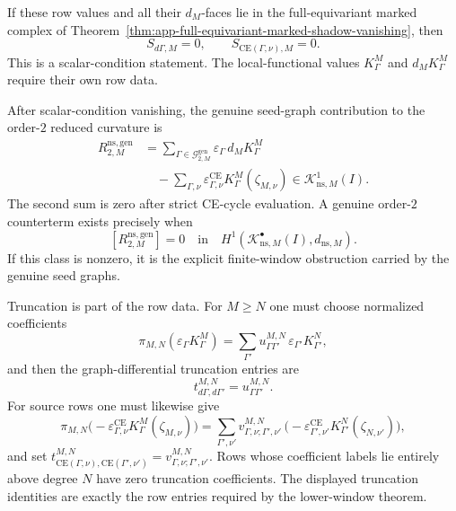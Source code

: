 \begin{prop}
  If these row values and all their \(d_M\)-faces lie in the
  full-equivariant marked complex of
  Theorem~\ref{thm:app-full-equivariant-marked-shadow-vanishing}, then
  \[
    S_{d\Gamma,M}=0,
    \qquad
    S_{\mathrm{CE}(\Gamma,\nu),M}=0.
  \]
  This is a scalar-condition statement.  The local-functional values
  \(K^M_\Gamma\) and \(d_M K^M_\Gamma\) require their own row data.

  After scalar-condition vanishing, the genuine seed-graph contribution to the
  order-\(2\) reduced curvature is
  \[
  \begin{aligned}
    R^{\mathrm{ns,gen}}_{2,M}
      &=
      \sum_{\Gamma\in\mathcal G^{\mathrm{gen}}_{2,M}}
        \varepsilon_\Gamma\,d_M K^M_\Gamma
      \\
      &\quad -
      \sum_{\Gamma,\nu}
        \varepsilon^{\mathrm{CE}}_{\Gamma,\nu}
        K^M_\Gamma(\zeta_{M,\nu})
      \in
      \mathcal K^1_{\mathrm{ns},M}(I).
  \end{aligned}
  \]
  The second sum is zero after strict CE-cycle evaluation.  A genuine
  order-\(2\) counterterm exists precisely when
  \[
    [R^{\mathrm{ns,gen}}_{2,M}]
      =
    0
    \quad\text{in}\quad
    H^1(\mathcal K^\bullet_{\mathrm{ns},M}(I),d_{\mathrm{ns},M}).
  \]
  If this class is nonzero, it is the explicit finite-window obstruction
  carried by the genuine seed graphs.

  Truncation is part of the row data.  For \(M\geq N\) one must choose
  normalized coefficients
  \[
    \pi_{M,N}(\varepsilon_\Gamma K^M_\Gamma)
      =
    \sum_{\Gamma'}
      u^{M,N}_{\Gamma\Gamma'}\,\varepsilon_{\Gamma'}K^N_{\Gamma'},
  \]
  and then the graph-differential truncation entries are
  \[
    t^{M,N}_{d\Gamma,d\Gamma'}=u^{M,N}_{\Gamma\Gamma'}.
  \]
  For source rows one must likewise give
  \[
    \pi_{M,N}
      \bigl(
        -\varepsilon^{\mathrm{CE}}_{\Gamma,\nu}
        K^M_\Gamma(\zeta_{M,\nu})
      \bigr)
      =
    \sum_{\Gamma',\nu'}
      v^{M,N}_{\Gamma,\nu;\Gamma',\nu'}\,
      \bigl(
        -\varepsilon^{\mathrm{CE}}_{\Gamma',\nu'}
        K^N_{\Gamma'}(\zeta_{N,\nu'})
      \bigr),
  \]
  and set
  \(t^{M,N}_{\mathrm{CE}(\Gamma,\nu),\mathrm{CE}(\Gamma',\nu')}=
  v^{M,N}_{\Gamma,\nu;\Gamma',\nu'}\).  Rows whose coefficient labels lie
  entirely above degree \(N\) have zero truncation coefficients.  The
  displayed truncation identities are exactly the row entries required by
  the lower-window theorem.


\end{prop}
